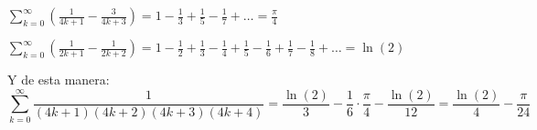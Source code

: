 \documentclass[../../main.tex]{subfiles}
\begin{document}
  $\displaystyle\sum_{k = 0}^\infty \left( \displaystyle\frac{1}{4k + 1} - \displaystyle\frac{3}{4k + 3} \right) = 1 - \displaystyle\frac{1}{3} + \displaystyle\frac{1}{5} - \displaystyle\frac{1}{7} + \dots = \displaystyle\frac{\pi}{4}$

  $\displaystyle\sum_{k = 0}^\infty \left(\displaystyle\frac{1}{2k + 1} - \displaystyle\frac{1}{2k + 2} \right) = 1 - \displaystyle\frac{1}{2} + \displaystyle\frac{1}{3} - \displaystyle\frac{1}{4} + \displaystyle\frac{1}{5} - \displaystyle\frac{1}{6} + \displaystyle\frac{1}{7} - \displaystyle\frac{1}{8} + \dots = \ln{(2)}$

  Y de esta manera:
  $$
  \sum_{k = 0}^\infty \frac{1}{(4k + 1)(4k + 2)(4k + 3)(4k + 4)} = \frac{\ln{(2)}}{3} - \frac{1}{6} \cdot \frac{\pi}{4} - \frac{\ln{(2)}}{12} = \frac{\ln{(2)}}{4} - \frac{\pi}{24}
  $$
\end{document}
